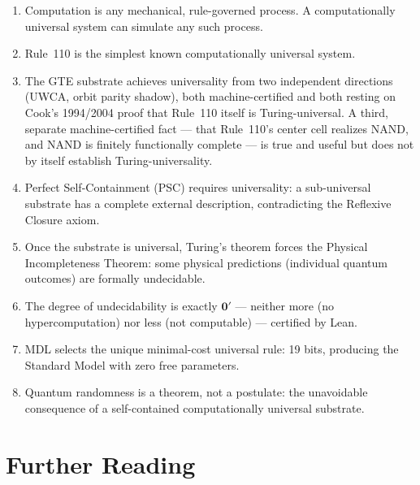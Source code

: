 \documentclass[11pt,a4paper]{article}
\begin{document}
\begin{tcolorbox}[colback=boxblue,colframe=blue!40!black,title=What we have shown]
\begin{enumerate}
\item Computation is any mechanical, rule-governed process.  A computationally
  universal system can simulate any such process.
\item Rule~110 is the simplest known computationally universal system.
\item The GTE substrate achieves universality from two independent directions
  (UWCA, orbit parity shadow), both machine-certified and both resting on
  Cook's 1994/2004 proof that Rule~110 itself is Turing-universal.  A third,
  separate machine-certified fact --- that Rule~110's center cell realizes
  NAND, and NAND is finitely functionally complete --- is true and useful but
  does not by itself establish Turing-universality.
\item Perfect Self-Containment (PSC) requires universality: a sub-universal substrate
  has a complete external description, contradicting the Reflexive Closure axiom.
\item Once the substrate is universal, Turing's theorem forces the Physical
  Incompleteness Theorem: some physical predictions (individual quantum outcomes)
  are formally undecidable.
\item The degree of undecidability is exactly $\mathbf{0}'$ — neither more (no
  hypercomputation) nor less (not computable) — certified by Lean.
\item MDL selects the unique minimal-cost universal rule: 19 bits, producing the
  Standard Model with zero free parameters.
\item Quantum randomness is a theorem, not a postulate: the unavoidable consequence
  of a self-contained computationally universal substrate.
\end{enumerate}
\end{tcolorbox}

\section*{Further Reading}
\end{document}
